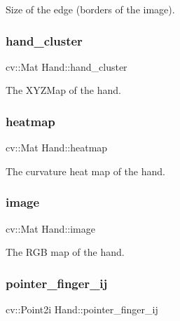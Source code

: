 Size of the edge (borders of the image). 

\hypertarget{class_hand_acbe984385f832d6b1d595dc280d59206}{}\label{class_hand_acbe984385f832d6b1d595dc280d59206} 
\subsubsection{\texorpdfstring{hand\+\_\+cluster}{hand\_cluster}}
{\footnotesize\ttfamily cv\+::\+Mat Hand\+::hand\+\_\+cluster\hspace{0.3cm}{\ttfamily [protected]}}



The X\+Y\+Z\+Map of the hand. 

\hypertarget{class_hand_ac449abf8573f0e3b313dc23c4be8f325}{}\label{class_hand_ac449abf8573f0e3b313dc23c4be8f325} 
\subsubsection{\texorpdfstring{heatmap}{heatmap}}
{\footnotesize\ttfamily cv\+::\+Mat Hand\+::heatmap\hspace{0.3cm}{\ttfamily [protected]}}



The curvature heat map of the hand. 

\hypertarget{class_hand_abfe6cc57de5f985ac7024c5f90d7f5da}{}\label{class_hand_abfe6cc57de5f985ac7024c5f90d7f5da} 
\subsubsection{\texorpdfstring{image}{image}}
{\footnotesize\ttfamily cv\+::\+Mat Hand\+::image\hspace{0.3cm}{\ttfamily [protected]}}



The R\+GB map of the hand. 

\hypertarget{class_hand_a7a7147d586c8fc8f781be0ed0dac1d94}{}\label{class_hand_a7a7147d586c8fc8f781be0ed0dac1d94} 
\subsubsection{\texorpdfstring{pointer\+\_\+finger\+\_\+ij}{pointer\_finger\_ij}}
{\footnotesize\ttfamily cv\+::\+Point2i Hand\+::pointer\+\_\+finger\+\_\+ij}



